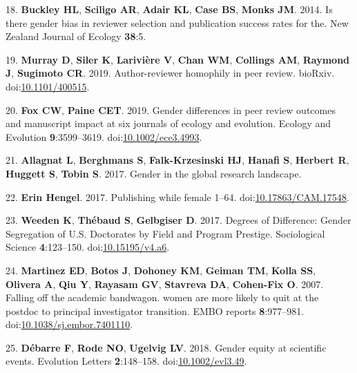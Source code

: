 \documentclass[11pt,]{article}
\begin{document}
\hypertarget{ref-buckley_is_2014}{}
18. \textbf{Buckley HL}, \textbf{Sciligo AR}, \textbf{Adair KL},
\textbf{Case BS}, \textbf{Monks JM}. 2014. Is there gender bias in
reviewer selection and publication success rates for the. New Zealand
Journal of Ecology \textbf{38}:5.

\hypertarget{ref-Murray400515}{}
19. \textbf{Murray D}, \textbf{Siler K}, \textbf{Larivière V},
\textbf{Chan WM}, \textbf{Collings AM}, \textbf{Raymond J},
\textbf{Sugimoto CR}. 2019. Author-reviewer homophily in peer review.
bioRxiv. doi:\href{https://doi.org/10.1101/400515}{10.1101/400515}.

\hypertarget{ref-fox_gender_2019}{}
20. \textbf{Fox CW}, \textbf{Paine CET}. 2019. Gender differences in
peer review outcomes and manuscript impact at six journals of ecology
and evolution. Ecology and Evolution \textbf{9}:3599--3619.
doi:\href{https://doi.org/10.1002/ece3.4993}{10.1002/ece3.4993}.

\hypertarget{ref-allagnat_gender_2017}{}
21. \textbf{Allagnat L}, \textbf{Berghmans S}, \textbf{Falk-Krzesinski
HJ}, \textbf{Hanafi S}, \textbf{Herbert R}, \textbf{Huggett S},
\textbf{Tobin S}. 2017. Gender in the global research landscape.

\hypertarget{ref-erin_hengel_publishing_2017}{}
22. \textbf{Erin Hengel}. 2017. Publishing while female 1--64.
doi:\href{https://doi.org/10.17863/CAM.17548}{10.17863/CAM.17548}.

\hypertarget{ref-weeden_degrees_2017}{}
23. \textbf{Weeden K}, \textbf{Thébaud S}, \textbf{Gelbgiser D}. 2017.
Degrees of Difference: Gender Segregation of U.S. Doctorates by Field
and Program Prestige. Sociological Science \textbf{4}:123--150.
doi:\href{https://doi.org/10.15195/v4.a6}{10.15195/v4.a6}.

\hypertarget{ref-Martinez2007}{}
24. \textbf{Martinez ED}, \textbf{Botos J}, \textbf{Dohoney KM},
\textbf{Geiman TM}, \textbf{Kolla SS}, \textbf{Olivera A}, \textbf{Qiu
Y}, \textbf{Rayasam GV}, \textbf{Stavreva DA}, \textbf{Cohen-Fix O}.
2007. Falling off the academic bandwagon. women are more likely to quit
at the postdoc to principal investigator transition. EMBO reports
\textbf{8}:977--981.
doi:\href{https://doi.org/10.1038/sj.embor.7401110}{10.1038/sj.embor.7401110}.

\hypertarget{ref-debarre_gender_2018}{}
25. \textbf{Débarre F}, \textbf{Rode NO}, \textbf{Ugelvig LV}. 2018.
Gender equity at scientific events. Evolution Letters
\textbf{2}:148--158.
doi:\href{https://doi.org/10.1002/evl3.49}{10.1002/evl3.49}.
\end{document}
